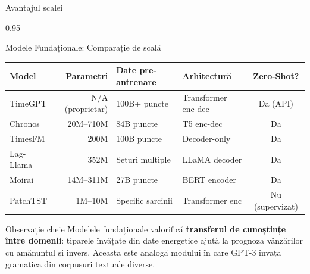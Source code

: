 \documentclass[9pt, aspectratio=169, t]{beamer}
\begin{document}
\begin{frame}{Avantajul scalei}
    \begin{cminipage}{0.95\textwidth}
    \vspace{-2mm}
    {\footnotesize
    \begin{block}{Modele Fundaționale: Comparație de scală}
    \vspace{-2mm}
    \begin{center}
    \begin{tabular}{l|r|l|l|c}
        \toprule
        \textbf{Model} & \textbf{Parametri} & \textbf{Date pre-antrenare} & \textbf{Arhitectură} & \textbf{Zero-Shot?} \\
        \midrule
        TimeGPT & N/A (proprietar) & 100B+ puncte & Transformer enc-dec & Da (API) \\
        Chronos & 20M--710M & 84B puncte & T5 enc-dec & Da \\
        TimesFM & 200M & 100B puncte & Decoder-only & Da \\
        Lag-Llama & 352M & Seturi multiple & LLaMA decoder & Da \\
        Moirai & 14M--311M & 27B puncte & BERT encoder & Da \\
        PatchTST & 1M--10M & Specific sarcinii & Transformer enc & Nu (supervizat) \\
        \bottomrule
    \end{tabular}
    \end{center}
    \vspace{-2mm}
    \end{block}
    }
    \vspace{-2mm}
    \begin{exampleblock}{Observație cheie}
        {\small Modelele fundaționale valorifică \textbf{transferul de cunoștințe între domenii}: tiparele învățate din date energetice ajută la prognoza vânzărilor cu amănuntul și invers. Aceasta este analogă modului în care GPT-3 învață gramatica din corpusuri textuale diverse.}
    \end{exampleblock}
    \end{cminipage}
\end{frame}
\end{document}
